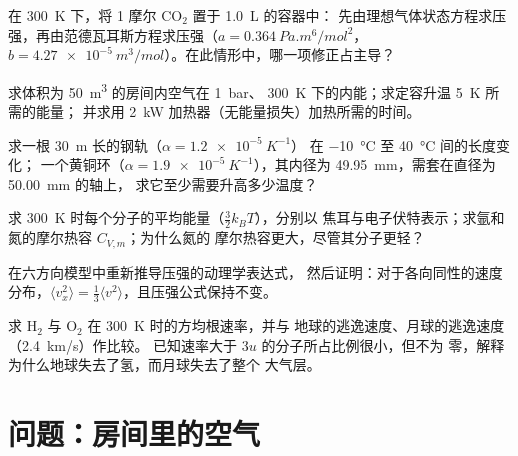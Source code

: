 \begin{exercise}[$\star\star$]\label{exo:b1:kinetic-theory:7}
在 \qty{300}{K} 下，将 1 摩尔 CO$_2$ 置于 \qty{1.0}{L} 的容器中：
先由理想气体状态方程求压强，再由范德瓦耳斯方程求压强（$a = \qty{0.364}{Pa.m^6/mol^2}$，
$b = \qty{4.27e-5}{m^3/mol}$）。在此情形中，哪一项修正占主导？
\end{exercise}

\begin{exercise}[$\star\star$]\label{exo:b1:kinetic-theory:8}
求体积为 \qty{50}{m^3} 的房间内空气在 \qty{1}{bar}、
\qty{300}{K} 下的内能；求定容升温 \qty{5}{K} 所需的能量；
并求用 \qty{2}{kW} 加热器（无能量损失）加热所需的时间。
\end{exercise}

\begin{exercise}[$\star\star$]\label{exo:b1:kinetic-theory:9}
求一根 \qty{30}{m} 长的钢轨（$\alpha = \qty{1.2e-5}{K^{-1}}$）
在 \qty{-10}{\degreeCelsius} 至 \qty{40}{\degreeCelsius} 间的长度变化；
一个黄铜环（$\alpha = \qty{1.9e-5}{K^{-1}}$），其内径为
\qty{49.95}{mm}，需套在直径为 \qty{50.00}{mm} 的轴上，
求它至少需要升高多少温度？
\end{exercise}

\begin{exercise}[$\star\star\star$]\label{exo:b1:kinetic-theory:10}
求 \qty{300}{K} 时每个分子的平均能量（$\tfrac32 k_BT$），分别以
焦耳与电子伏特表示；求氩和氮的摩尔热容 $C_{V,m}$；为什么氮的
摩尔热容更大，尽管其分子更轻？
\end{exercise}

\begin{exercise}[$\star\star\star$]\label{exo:b1:kinetic-theory:11}
在六方向模型中重新推导压强的动理学表达式，
然后证明：对于各向同性的速度分布，$\langle v_x^2\rangle
= \tfrac13\langle v^2\rangle$，且压强公式保持不变。
\end{exercise}

\begin{exercise}[$\star\star\star$]\label{exo:b1:kinetic-theory:12}
求 H$_2$ 与 O$_2$ 在 \qty{300}{K} 时的方均根速率，并与
地球的逃逸速度、月球的逃逸速度（\qty{2.4}{km/s}）作比较。
已知速率大于 $3u$ 的分子所占比例很小，但不为
零，解释为什么地球失去了氢，而月球失去了整个
大气层。
\end{exercise}

\section{问题：房间里的空气}

